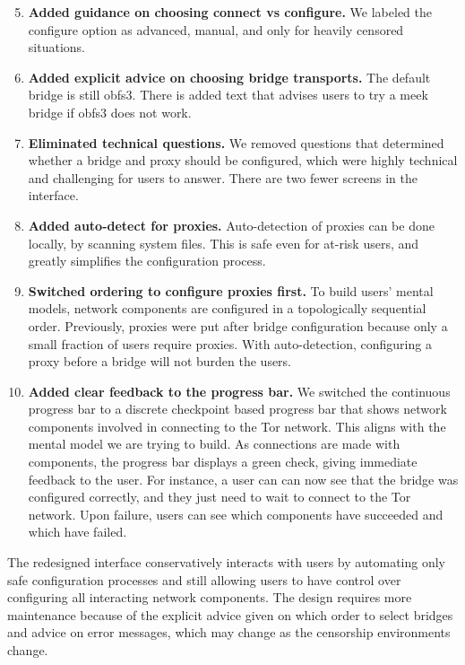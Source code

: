 \documentclass[USenglish,oneside,twocolumn]{article}
\begin{document}
\begin{enumerate}
\setcounter{enumi}{4}
\item {\bfseries Added guidance on choosing connect vs configure.} We labeled the configure option as advanced, manual, and only for heavily censored situations. 
\item {\bfseries Added explicit advice on choosing bridge transports.} The default bridge is still obfs3. There is added text that advises users to try a meek bridge if obfs3 does not work. 

\item {\bfseries Eliminated technical questions.}  We removed questions that determined whether a bridge and proxy should be configured, which were highly technical and challenging for users to answer. There are two fewer screens in the interface.
\item {\bfseries Added auto-detect for proxies.} Auto-detection of proxies can be done locally, by scanning system files. This is safe even for at-risk users, and greatly simplifies the configuration process. 

\item {\bfseries Switched ordering to configure proxies first.} To build users' mental models, network components are configured in a topologically sequential order. Previously, proxies were put after bridge configuration because only a small fraction of users require proxies. With auto-detection, configuring a proxy before a bridge will not burden the users. 
\item {\bfseries Added clear feedback to the progress bar.} We switched the continuous progress bar to a discrete checkpoint based progress bar that shows network components involved in connecting to the Tor network. This aligns with the mental model we are trying to build. As connections are made with components, the progress bar displays a green check, giving immediate feedback to the user. For instance, a user can can now see that the bridge was configured correctly, and they just need to wait to connect to the Tor network. Upon failure, users can see which components have succeeded and which have failed.
\end{enumerate}

The redesigned interface conservatively interacts with users by automating only safe configuration processes and still allowing users to have control over configuring all interacting network components. The design requires more maintenance because of the explicit advice given on which order to select bridges and advice on error messages, which may change as the censorship environments change. 
\end{document}
